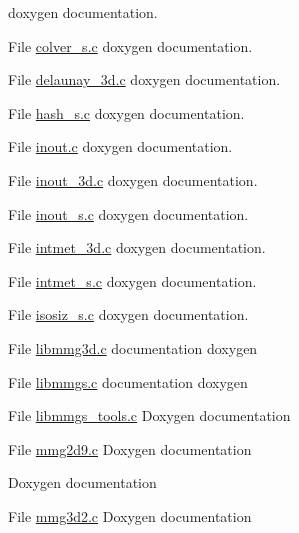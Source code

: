\begin{DoxyRefList}
%
doxygen documentation.  
\item[File \mbox{\hyperlink{colver__s_8c}{colver\+\_\+s.c}} ]\label{todo__todo000043}%
%
doxygen documentation.  
\item[File \mbox{\hyperlink{delaunay__3d_8c}{delaunay\+\_\+3d.c}} ]\label{todo__todo000019}%
%
doxygen documentation.  
\item[File \mbox{\hyperlink{hash__s_8c}{hash\+\_\+s.c}} ]\label{todo__todo000044}%
%
doxygen documentation.  
\item[File \mbox{\hyperlink{inout_8c}{inout.c}} ]\label{todo__todo000004}%
%
doxygen documentation.  
\item[File \mbox{\hyperlink{inout__3d_8c}{inout\+\_\+3d.c}} ]\label{todo__todo000021}%
%
doxygen documentation.  
\item[File \mbox{\hyperlink{inout__s_8c}{inout\+\_\+s.c}} ]\label{todo__todo000045}%
%
doxygen documentation.  
\item[File \mbox{\hyperlink{intmet__3d_8c}{intmet\+\_\+3d.c}} ]\label{todo__todo000022}%
%
doxygen documentation.  
\item[File \mbox{\hyperlink{intmet__s_8c}{intmet\+\_\+s.c}} ]\label{todo__todo000046}%
%
doxygen documentation.  
\item[File \mbox{\hyperlink{isosiz__s_8c}{isosiz\+\_\+s.c}} ]\label{todo__todo000047}%
%
doxygen documentation.  
\item[File \mbox{\hyperlink{libmmg3d_8c}{libmmg3d.c}} ]\label{todo__todo000023}%
%
documentation doxygen 
\item[File \mbox{\hyperlink{libmmgs_8c}{libmmgs.c}} ]\label{todo__todo000048}%
%
documentation doxygen 
\item[File \mbox{\hyperlink{libmmgs__tools_8c}{libmmgs\+\_\+tools.c}} ]\label{todo__todo000049}%
%
Doxygen documentation  
\item[File \mbox{\hyperlink{mmg2d9_8c}{mmg2d9.c}} ]\label{todo__todo000009}%
%
Doxygen documentation 

\label{todo__todo000008}%
%
Doxygen documentation  
\item[File \mbox{\hyperlink{mmg3d2_8c}{mmg3d2.c}} ]\label{todo__todo000025}%
%
Doxygen documentation 


\end{DoxyRefList}
